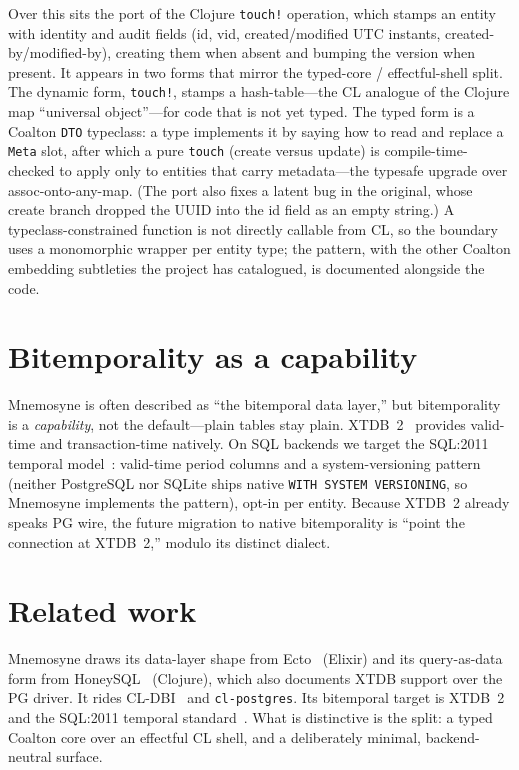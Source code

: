 \documentclass[11pt,a4paper]{article}
\begin{document}
Over this sits the port of the Clojure \texttt{touch!} operation, which stamps an entity with
identity and audit fields (id, vid, created/modified UTC instants, created-by/modified-by),
creating them when absent and bumping the version when present. It appears in two forms that
mirror the typed-core / effectful-shell split. The dynamic form, \texttt{touch!}, stamps a
hash-table---the CL analogue of the Clojure map ``universal object''---for code that is not
yet typed. The typed form is a Coalton \texttt{DTO} typeclass: a type implements it by saying
how to read and replace a \texttt{Meta} slot, after which a pure \texttt{touch} (create versus
update) is compile-time-checked to apply only to entities that carry metadata---the typesafe
upgrade over assoc-onto-any-map. (The port also fixes a latent bug in the original, whose
create branch dropped the UUID into the id field as an empty string.) A typeclass-constrained
function is not directly callable from CL, so the boundary uses a monomorphic wrapper per
entity type; the pattern, with the other Coalton embedding subtleties the project has
catalogued, is documented alongside the code.

\section{Bitemporality as a capability}
\label{sec:bitemporal}
Mnemosyne is often described as ``the bitemporal data layer,'' but bitemporality is a
\emph{capability}, not the default---plain tables stay plain. XTDB~2~\citep{xtdb} provides
valid-time and transaction-time natively. On SQL backends we target the SQL:2011 temporal
model~\citep{sql2011}: valid-time period columns and a system-versioning pattern (neither
PostgreSQL nor SQLite ships native \texttt{WITH SYSTEM VERSIONING}, so Mnemosyne implements
the pattern), opt-in per entity. Because XTDB~2 already speaks PG wire, the future migration
to native bitemporality is ``point the connection at XTDB~2,'' modulo its distinct dialect.

\section{Related work}
\label{sec:related}
Mnemosyne draws its data-layer shape from Ecto~\citep{ecto} (Elixir) and its query-as-data
form from HoneySQL~\citep{honeysql} (Clojure), which also documents XTDB support over the PG
driver. It rides CL-DBI~\citep{cldbi} and \texttt{cl-postgres}. Its bitemporal target is
XTDB~2~\citep{xtdb} and the SQL:2011 temporal standard~\citep{sql2011}. What is distinctive
is the split: a typed Coalton core over an effectful CL shell, and a deliberately minimal,
backend-neutral surface.
\end{document}
